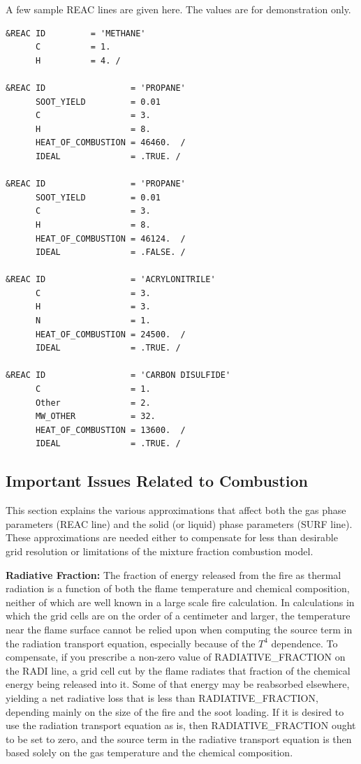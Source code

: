 \documentclass[11pt]{book}
\begin{document}
\noindent
A few sample {\ct REAC} lines are given here. The values are for demonstration only.


\footnotesize
\begin{verbatim}
&REAC ID         = 'METHANE'
      C          = 1.
      H          = 4. /

&REAC ID                 = 'PROPANE'
      SOOT_YIELD         = 0.01
      C                  = 3.
      H                  = 8.
      HEAT_OF_COMBUSTION = 46460.  /
      IDEAL              = .TRUE. /

&REAC ID                 = 'PROPANE'
      SOOT_YIELD         = 0.01
      C                  = 3.
      H                  = 8.
      HEAT_OF_COMBUSTION = 46124.  /
      IDEAL              = .FALSE. /

&REAC ID                 = 'ACRYLONITRILE'
      C                  = 3.
      H                  = 3.
      N                  = 1.
      HEAT_OF_COMBUSTION = 24500.  /
      IDEAL              = .TRUE. /

&REAC ID                 = 'CARBON DISULFIDE'
      C                  = 1.
      Other              = 2.
      MW_OTHER           = 32.
      HEAT_OF_COMBUSTION = 13600.  /
      IDEAL              = .TRUE. /
\end{verbatim}
\normalsize


\subsection{Important Issues Related to Combustion}%
\label{info:combustion}

This section explains the various approximations that
affect both the gas phase parameters ({\ct REAC} line) and the
solid (or liquid) phase parameters ({\ct SURF} line). These
approximations are needed either to compensate for less than
desirable grid resolution or limitations of the mixture fraction
combustion model.


\vspace{\baselineskip}
\noindent
{\bf Radiative Fraction:} The fraction of energy released from the
fire as thermal radiation is a function of both the flame temperature
and chemical composition, neither of which are well known in a large
scale fire calculation.
In calculations in which the grid cells are on the order of a centimeter and
larger, the temperature near the flame surface cannot be relied upon when
computing the source term in the radiation transport equation, especially
because of the $T^4$ dependence.
To compensate, if you prescribe a non-zero
value of {\ct RADIATIVE\_FRACTION} on the {\ct RADI} line, a grid cell cut by the flame
radiates that fraction of the chemical energy being released into it.
Some of that energy may be reabsorbed elsewhere, yielding a net radiative
loss that is less than {\ct RADIATIVE\_FRACTION}, depending mainly on the size of
the fire and the soot loading. If it is desired to use the radiation transport
equation as is, then {\ct RADIATIVE\_FRACTION} ought to be set to zero,
and the source term in the radiative transport equation is then based solely
on the gas temperature and the chemical composition.
\end{document}
